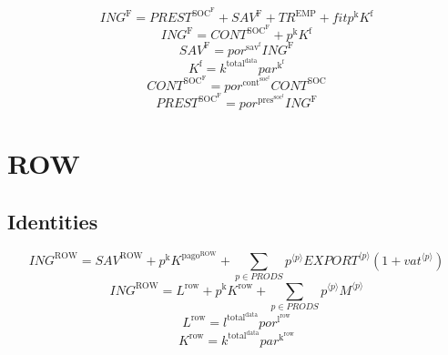 \begin{equation}
{I\!N\!G}^{\mathrm{F}} = {P\!R\!E\!S\!T}^{\mathrm{SOC}^{\mathrm{F}}} + {S\!A\!V}^{\mathrm{F}} + {T\!R}^{\mathrm{EMP}} + {{f\!i\!t}} {p^{\mathrm{k}}} {K^{\mathrm{f}}}
\end{equation}
\begin{equation}
{I\!N\!G}^{\mathrm{F}} = {C\!O\!N\!T}^{\mathrm{SOC}^{\mathrm{F}}} + {p^{\mathrm{k}}} {K^{\mathrm{f}}}
\end{equation}
\begin{equation}
{S\!A\!V}^{\mathrm{F}} = {{p\!o\!r}^{\mathrm{sav}^{\mathrm{f}}}} {{I\!N\!G}^{\mathrm{F}}}
\end{equation}
\begin{equation}
K^{\mathrm{f}} = {k^{\mathrm{total}^{\mathrm{data}}}} {{p\!a\!r}^{\mathrm{k}^{\mathrm{f}}}}
\end{equation}
\begin{equation}
{C\!O\!N\!T}^{\mathrm{SOC}^{\mathrm{F}}} = {{p\!o\!r}^{\mathrm{cont}^{\mathrm{soc}^{\mathrm{f}}}}} {{C\!O\!N\!T}^{\mathrm{SOC}}}
\end{equation}
\begin{equation}
{P\!R\!E\!S\!T}^{\mathrm{SOC}^{\mathrm{F}}} = {{p\!o\!r}^{\mathrm{pres}^{\mathrm{soc}^{\mathrm{f}}}}} {{I\!N\!G}^{\mathrm{F}}}
\end{equation}




\section{ROW}

\subsection{Identities}

\begin{equation}
{I\!N\!G}^{\mathrm{ROW}} = {S\!A\!V}^{\mathrm{ROW}} + {p^{\mathrm{k}}} {K^{\mathrm{pago}^{\mathrm{ROW}}}} + \sum_{p\in {P\!R\!O\!D\!S}} {{p}^{\langle p\rangle}} {{{E\!X\!P\!O\!R\!T}}^{\langle p\rangle}} \left(1 + {{v\!a\!t}}^{\langle p\rangle}\right)
\end{equation}
\begin{equation}
{I\!N\!G}^{\mathrm{ROW}} = L^{\mathrm{row}} + {p^{\mathrm{k}}} {K^{\mathrm{row}}} + \sum_{p\in {P\!R\!O\!D\!S}} {{p}^{\langle p\rangle}} {{M}^{\langle p\rangle}}
\end{equation}
\begin{equation}
L^{\mathrm{row}} = {l^{\mathrm{total}^{\mathrm{data}}}} {{p\!o\!r}^{\mathrm{l}^{\mathrm{row}}}}
\end{equation}
\begin{equation}
K^{\mathrm{row}} = {k^{\mathrm{total}^{\mathrm{data}}}} {{p\!a\!r}^{\mathrm{k}^{\mathrm{row}}}}
\end{equation}




